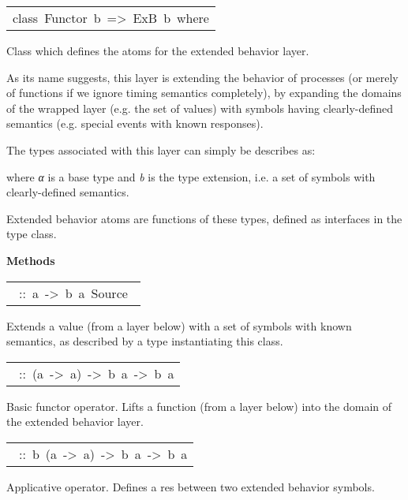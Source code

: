 \begin{haddockdesc}
\item[\begin{tabular}{@{}l}
class\ Functor\ b\ =>\ ExB\ b\ where
\end{tabular}]\haddockbegindoc
Class which defines the atoms for the extended behavior layer.\par
As its name suggests, this layer is extending the behavior of
 processes (or merely of functions if we ignore timing semantics
 completely), by expanding the domains of the wrapped layer
 (e.g. the set of values) with symbols having clearly-defined
 semantics (e.g. special events with known responses).\par
The types associated with this layer can simply be describes as:\par
{}\par
where  \emph{α} is a base type and \emph{b} is the type extension,
 i.e. a set of symbols with clearly-defined semantics.\par
Extended behavior atoms are functions of these types, defined as
 interfaces in the  type class.\par

\haddockpremethods{}\textbf{Methods}
\begin{haddockdesc}
\item[\begin{tabular}{@{}l}\haddockid{extend}\ ::\ a\ ->\ b\ a\ Source\ \end{tabular}]
\haddockbegindoc
Extends a value (from a layer below) with a set of symbols with known semantics, as described by a type instantiating this class.\par

\item[\begin{tabular}{@{}l}\haddockid{(/.\textbackslash)}\ ::\ (a\ ->\ a)\ ->\ b\ a\ ->\ b\ a\end{tabular}]
\haddockbegindoc
Basic functor operator. Lifts a function (from a layer below) into the domain of the extended behavior layer.\par

\item[\begin{tabular}{@{}l}\haddockid{(/*\textbackslash)}\ ::\ b\ (a\ ->\ a)\ ->\ b\ a\ ->\ b\ a\end{tabular}]
\haddockbegindoc
Applicative operator. Defines a res between two extended behavior symbols.\par


\end{haddockdesc}
\end{haddockdesc}
